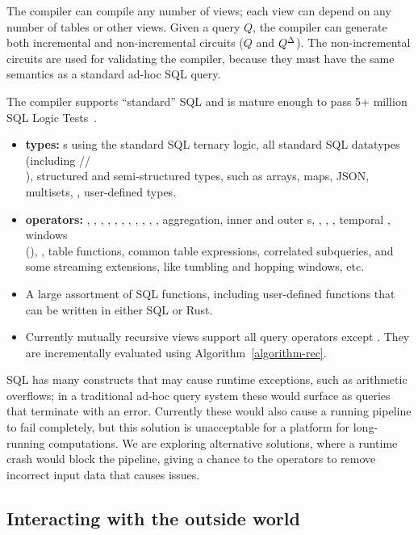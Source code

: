 The compiler can compile any number of views; each view can depend on
any number of tables or other views.  Given a query $Q$, the compiler
can generate both incremental and non-incremental circuits ($Q$ and
${Q}^{\Delta}$).  The non-incremental circuits are used for validating the
compiler, because they must have the same semantics as a standard
ad-hoc SQL query.

The compiler supports ``standard'' SQL and is mature enough to pass
5+ million SQL Logic Tests~\cite{sqllogictest}.
\begin{itemize}
\item \textbf{types:} s using the standard SQL ternary
  logic, all standard SQL datatypes (including
  //\\), structured and
  semi-structured types, such as arrays, maps, JSON, multisets,
  , user-defined types.
\item \textbf{operators:} , , ,
  ,  , ,
  , , , ,
  , aggregation, inner and outer s,
  , , , temporal ,
  windows \\ (), , table
  functions, common table expressions, correlated subqueries, and some
  streaming extensions, like tumbling and hopping windows, etc.
\item A large assortment of SQL functions, including user-defined
  functions that can be written in either SQL or Rust.
\item Currently mutually recursive views support all query operators
  except .  They are incrementally evaluated using
  Algorithm~\ref{algorithm-rec}.
\end{itemize}

SQL has many constructs that may cause runtime exceptions, such as
arithmetic overflows; in a traditional ad-hoc query system these
would surface as queries that terminate with an error.  Currently
these would also cause a running pipeline to fail completely, but this
solution is unacceptable for a platform for long-running computations.
We are exploring alternative solutions, where a runtime crash would
block the pipeline, giving a chance to the operators to remove
incorrect input data that causes issues.

\subsection{Interacting with the outside world}

